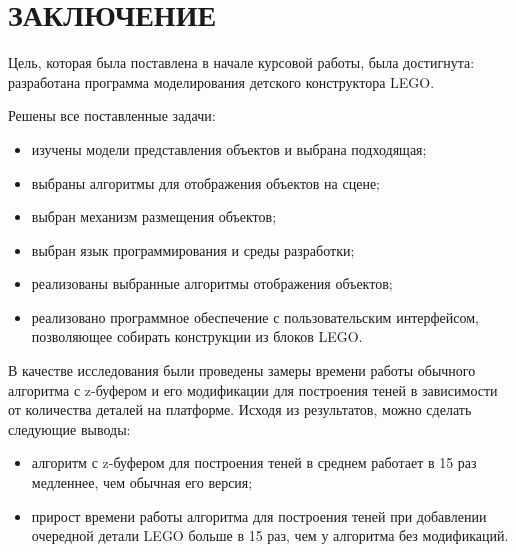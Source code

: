 \chapter*{ЗАКЛЮЧЕНИЕ}

Цель, которая была поставлена в начале курсовой работы, была достигнута: разработана программа моделирования детского конструктора LEGO.

Решены все поставленные задачи:
\begin{itemize}[label=---]
	\item изучены модели представления объектов и выбрана подходящая;
	\item выбраны алгоритмы для отображения объектов на сцене;
    \item выбран механизм размещения объектов;
	\item выбран язык программирования и среды разработки;
    \item реализованы выбранные алгоритмы отображения объектов;
    \item реализовано программное обеспечение с пользовательским интерфейсом, позволяющее собирать конструкции из блоков LEGO.
\end{itemize}

В качестве исследования были проведены замеры времени работы обычного алгоритма с z-буфером и его модификации для построения теней в зависимости от количества деталей на платформе. Исходя из результатов, можно сделать следующие выводы:
\begin{itemize}[label=---]
    \item алгоритм с z-буфером для построения теней в среднем работает в 15 раз медленнее, чем обычная его версия;
    \item прирост времени работы алгоритма для построения теней при добавлении очередной детали LEGO больше в 15 раз, чем у алгоритма без модификаций.
\end{itemize}
